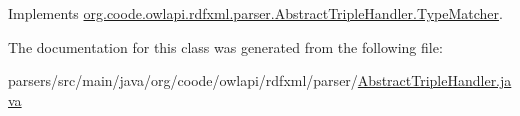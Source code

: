 Implements \hyperlink{interfaceorg_1_1coode_1_1owlapi_1_1rdfxml_1_1parser_1_1_abstract_triple_handler_1_1_type_matcher_a3799fbaf5170e1276c0da2839498c275}{org.\-coode.\-owlapi.\-rdfxml.\-parser.\-Abstract\-Triple\-Handler.\-Type\-Matcher}.



The documentation for this class was generated from the following file\-:\begin{DoxyCompactItemize}
\item 
parsers/src/main/java/org/coode/owlapi/rdfxml/parser/\hyperlink{_abstract_triple_handler_8java}{Abstract\-Triple\-Handler.\-java}\end{DoxyCompactItemize}
